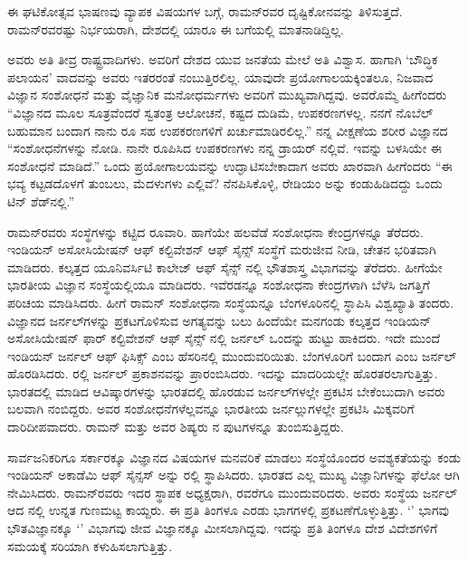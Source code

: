 \newpage

ಈ ಘಟಿಕೋತ್ಸವ ಭಾಷಣವು ವ್ಯಾಪಕ ವಿಷಯಗಳ ಬಗ್ಗೆ, ರಾಮನ್‍ರವರ ದೃಷ್ಟಿಕೋನವನ್ನು ತಿಳಿಸುತ್ತದೆ. ರಾಮನ್‍ರವರಷ್ಟು ನಿರ್ಭಯರಾಗಿ, ದೇಶದಲ್ಲಿ ಯಾರೂ ಈ ಬಗೆಯಲ್ಲಿ ಮಾತನಾಡಿದ್ದಿಲ್ಲ.

ಅವರು ಅತಿ ತೀವ್ರ ರಾಷ್ಟ್ರವಾದಿಗಳು. ಅವರಿಗೆ ದೇಶದ ಯುವ ಜನತೆಯ ಮೇಲೆ ಅತಿ ವಿಶ್ವಾಸ. ಹಾಗಾಗಿ ‘ಬೌದ್ಧಿಕ ಪಲಾಯನ’ ವಾದವನ್ನು ಅವರು ಇತರರಂತೆ ನಂಬುತ್ತಿರಲಿಲ್ಲ. ಯಾವುದೇ ಪ್ರಯೋಗಾಲಯಕ್ಕಿಂತಲೂ, ನಿಜವಾದ ವಿಜ್ಞಾನ ಸಂಶೋಧನೆ ಮತ್ತು ವೈಜ್ಞಾನಿಕ ಮನೋಧರ್ಮಗಳು ಅವರಿಗೆ ಮುಖ್ಯವಾಗಿದ್ದವು. ಅವರೊಮ್ಮೆ ಹೀಗೆಂದರು “ವಿಜ್ಞಾನದ ಮೂಲ ಸೂತ್ರವೆಂದರೆ ಸ್ವತಂತ್ರ ಆಲೋಚನೆ, ಕಷ್ಟದ ದುಡಿಮೆ, ಉಪಕರಣಗಳಲ್ಲ. ನನಗೆ ನೊಬೆಲ್ ಬಹುಮಾನ ಬಂದಾಗ ನಾನು  ರೂ ಸಹ ಉಪಕರಣಗಳಿಗೆ ಖರ್ಚುಮಾಡಿರಲಿಲ್ಲ.” ನನ್ನ ವೀಕ್ಷಣೆಯ ಶರೀರ ವಿಜ್ಞಾನದ “ಸಂಶೋಧನೆಗಳನ್ನು ನೋಡಿ. ನಾನೇ ರೂಪಿಸಿದ ಉಪಕರಣಗಳು ನನ್ನ ಡ್ರಾಯರ್ ನಲ್ಲಿವೆ. ಇವನ್ನು ಬಳಸಿಯೇ ಈ ಸಂಶೋಧನೆ ಮಾಡಿದೆ.” ಒಂದು ಪ್ರಯೋಗಾಲಯವನ್ನು ಉದ್ಘಾಟಿಸಬೇಕಾದಾಗ ಅವರು ಖಾರವಾಗಿ ಹೀಗೆಂದರು  “ಈ ಭವ್ಯ ಕಟ್ಟಡದೊಳಗೆ ತುಂಬಲು, ಮೆದಳುಗಳು ಎಲ್ಲಿವೆ? ನೆನಪಿಸಿಕೊಳ್ಳಿ, ರೇಡಿಯಂ ಅನ್ನು ಕಂಡುಹಿಡಿದದ್ದು ಒಂದು ಟಿನ್ ಶೆಡ್‍ನಲ್ಲಿ.”



ರಾಮನ್‍ರವರು ಸಂಸ್ಥೆಗಳನ್ನು ಕಟ್ಟಿದ ರೂವಾರಿ. ಹಾಗೆಯೇ ಹಲವೆಡೆ ಸಂಶೋಧನಾ ಕೇಂದ್ರಗಳನ್ನೂ ತೆರೆದರು. ಇಂಡಿಯನ್ ಅಸೋಸಿಯೇಷನ್ ಆಫ್ ಕಲ್ಟಿವೇಶನ್ ಆಫ್ ಸೈನ್ಸ್ ಸಂಸ್ಥೆಗೆ ಮರುಜೀವ ನೀಡಿ, ಚೇತನ ಭರಿತವಾಗಿ ಮಾಡಿದರು. ಕಲ್ಕತ್ತದ ಯೂನಿವರ್ಸಿಟಿ ಕಾಲೇಜ್ ಆಫ್ ಸೈನ್ಸ್ ನಲ್ಲಿ ಭೌತಶಾಸ್ತ್ರ ವಿಭಾಗವನ್ನು ತೆರೆದರು. ಹೀಗೆಯೇ ಭಾರತೀಯ ವಿಜ್ಞಾನ ಸಂಸ್ಥೆಯಲ್ಲಿಯೂ ಮಾಡಿದರು. ಇವೆರಡನ್ನೂ ಸಂಶೋಧನಾ ಕೇಂದ್ರಗಳಾಗಿ ಬೆಳೆಸಿ ಜಗತ್ತಿಗೆ ಪರಿಚಯ ಮಾಡಿಸಿದರು. ಹೀಗೆ ರಾಮನ್ ಸಂಶೋಧನಾ ಸಂಸ್ಥೆಯನ್ನೂ ಬೆಂಗಳೂರಿನಲ್ಲಿ ಸ್ಥಾಪಿಸಿ ವಿಶ್ವಖ್ಯಾತಿ ತಂದರು. ವಿಜ್ಞಾನದ ಜರ್ನಲ್‍ಗಳನ್ನು ಪ್ರಕಟಗೊಳಿಸುವ ಅಗತ್ಯವನ್ನು ಬಲು ಹಿಂದೆಯೇ ಮನಗಂಡು ಕಲ್ಕತ್ತದ ಇಂಡಿಯನ್ ಅಸೋಸಿಯೇಷನ್ ಫಾರ್ ಕಲ್ಟಿವೇಶನ್ ಆಫ್ ಸೈನ್ಸ್ ‍ನಲ್ಲಿ ಜರ್ನಲ್ ಒಂದನ್ನು ಹುಟ್ಟು ಹಾಕಿದರು. ಇದೇ ಮುಂದೆ ಇಂಡಿಯನ್ ಜರ್ನಲ್ ಆಫ್ ಫಿಸಿಕ್ಸ್ ಎಂಬ ಹೆಸರಿನಲ್ಲಿ ಮುಂದುವರಿಯಿತು. ಬೆಂಗಳೂರಿಗೆ ಬಂದಾಗ \textit{} ಎಂಬ ಜರ್ನಲ್ ಹೊರಡಿಸಿದರು. ರಲ್ಲಿ \textit{} ಜರ್ನಲ್ ಪ್ರಕಾಶನವನ್ನು ಪ್ರಾರಂಬಿಸಿದರು. ಇದನ್ನು \textit{} ಮಾದರಿಯಲ್ಲೇ ಹೊರತರಲಾಗುತ್ತಿತ್ತು. ಭಾರತದಲ್ಲಿ ಮಾಡಿದ ಆವಿಷ್ಕಾರಗಳನ್ನು ಭಾರತದಲ್ಲಿ ಹೊರಡುವ ಜರ್ನಲ್‍ಗಳಲ್ಲೇ ಪ್ರಕಟಿಸ ಬೇಕೆಂಬುದಾಗಿ ಅವರು ಬಲವಾಗಿ ನಂಬಿದ್ದರು. ಅವರ ಸಂಶೋಧನೆಗಳೆಲ್ಲವನ್ನೂ ಭಾರತೀಯ ಜರ್ನಲ್ಲುಗಳಲ್ಲೇ ಪ್ರಕಟಿಸಿ ಮಿಕ್ಕವರಿಗೆ ದಾರಿದೀಪವಾದರು. ರಾಮನ್ ಮತ್ತು ಅವರ ಶಿಷ್ಯರು \textit{} ನ ಪುಟಗಳನ್ನೂ ತುಂಬಿಸುತ್ತಿದ್ದರು.

ಸಾರ್ವಜನಿಕರಿಗೂ ಸರ್ಕಾರಕ್ಕೂ ವಿಜ್ಞಾನದ ವಿಷಯಗಳ ಮನವರಿಕೆ ಮಾಡಲು ಸಂಸ್ಥೆಯೊಂದರ ಅವಶ್ಯಕತೆಯನ್ನು ಕಂಡು ಇಂಡಿಯನ್ ಅಕಾಡೆಮಿ ಆಫ್ ಸೈನ್ಸಸ್ ಅನ್ನು ರಲ್ಲಿ ಸ್ಥಾಪಿಸಿದರು. ಭಾರತದ ಎಲ್ಲ ಮುಖ್ಯ ವಿಜ್ಞಾನಿಗಳನ್ನು ಫೆಲೋ ಆಗಿ ನೇಮಿಸಿದರು. ರಾಮನ್‍ರವರು ಇದರ ಸ್ಥಾಪಕ ಅಧ್ಯಕ್ಷರಾಗಿ,  ರವರೆಗೂ ಮುಂದುವರಿದರು. ಅವರು ಸಂಸ್ಥೆಯ ಜರ್ನಲ್ ಆದ  ನಲ್ಲಿ ಉನ್ನತ ಗುಣಮಟ್ಟ ಕಾಯ್ದರು. ಈ  ಪ್ರತಿ ತಿಂಗಳೂ ಎರಡು ಭಾಗಗಳಲ್ಲಿ ಪ್ರಕಟಣೆಗೊಳ್ಳುತ್ತಿತ್ತು. ‘’ ಭಾಗವು ಭೌತವಿಜ್ಞಾನಕ್ಕೂ ‘’ ವಿಭಾಗವು ಜೀವ ವಿಜ್ಞಾನಕ್ಕೂ ಮೀಸಲಾಗಿದ್ದವು. ಇದನ್ನು ಪ್ರತಿ ತಿಂಗಳೂ ದೇಶ ವಿದೇಶಗಳಿಗೆ ಸಮಯಕ್ಕೆ ಸರಿಯಾಗಿ ಕಳುಹಿಸಲಾಗುತ್ತಿತ್ತು.

